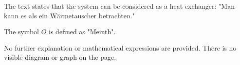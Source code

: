 The text states that the system can be considered as a heat exchanger:  
"Man kann es als ein Wärmetauscher betrachten."  

The symbol \( O \) is defined as "Meinth".  

No further explanation or mathematical expressions are provided. There is no visible diagram or graph on the page.